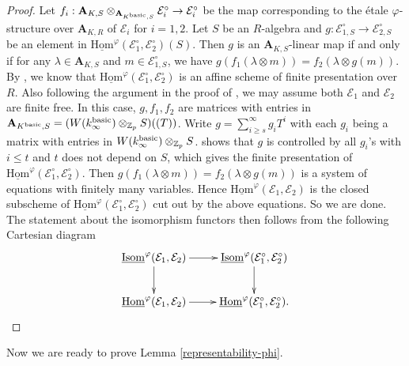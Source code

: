 \documentclass[10pt]{article}
\numberwithin{equation}{section}
\newcommand{\bZ}{{\mathbb Z}}
\newcommand{\calE}{{\mathcal E}}
\newcommand{\Hom}{{\mathrm{Hom}}}           %
\newcommand{\Isom}{{\mathrm{Isom}}}         %
\newcommand{\bfA}{{\textbf{A}}}
\begin{document}
\begin{proof}
    Let $f_i:\bfA_{K,S}\otimes_{\bfA_{K^{\rm basic},S}}\calE_{i}^{\circ}\to \calE_{i}^{\circ}$ be the map corresponding to the \'etale $\varphi$-structure over $\bfA_{K,R}$ of $\calE_i$ for $i=1,2$. Let $S$ be an $R$-algebra and $g:\calE_{1,S}^{\circ}\to \calE^{\circ}_{2,S}$ be an element in $\underline\Hom^{\varphi}(\calE_1^{\circ},\calE_2^{\circ})(S)$. Then $g$ is an $\bfA_{K,S}$-linear map if and only if for any $\lambda\in \bfA_{K,S}$ and $m\in \calE^{\circ}_{1,S}$, we have $g(f_1(\lambda\otimes m))=f_2(\lambda\otimes g(m))$. By \cite[Lemma 5.4.8]{EG21}, we know that $\underline\Hom^{\varphi}(\calE_1^{\circ},\calE_2^{\circ})$ is an affine scheme of finite presentation over $R$. Also following the argument in the proof of \cite[Lemma 5.4.8]{EG21}, we may assume both $\calE_1$ and $\calE_2$ are finite free. In this case, $g, f_1, f_2$ are matrices with entries in $\bfA_{K^{\rm basic},S}=(W(k_{\infty}^{\rm basic})\otimes_{\bZ_p}S)((T))$. Write $g=\sum_{i\geq s}^{\infty}g_iT^i$ with each $g_i$ being a matrix with entries in $W(k_{\infty}^{\rm basic})\otimes_{\bZ_p}S$. \cite[Lemma 5.4.8]{EG21} shows that $g$ is controlled by all $g_i$'s with $i\leq t$ and $t$ does not depend on $S$, which gives the finite presentation of $\underline{\Hom}^{\varphi}(\calE_1^{\circ},\calE_2^{\circ})$. Then $g(f_1(\lambda\otimes m))=f_2(\lambda\otimes g(m))$ is a system of equations with finitely many variables. Hence $\underline\Hom^{\varphi}(\calE_1,\calE_2)$ is the closed subscheme of $\underline\Hom^{\varphi}(\calE_1^{\circ},\calE_2^{\circ})$ cut out by the above equations. So we are done. The statement about the isomorphism functors then follows from the following Cartesian diagram
    \begin{equation}
    \xymatrix{
    \underline\Isom^{\varphi}(\calE_1,\calE_2)\ar[r]\ar[d]& \underline\Isom^{\varphi}(\calE_1^{\circ},\calE_2^{\circ})\ar[d]\\
    \underline\Hom^{\varphi}(\calE_1,\calE_2)\ar[r]& \underline\Hom^{\varphi}(\calE_1^{\circ},\calE_2^{\circ}).
    }
\end{equation}

\end{proof}

Now we are ready to prove Lemma \ref{representability-phi}.
\end{document}
